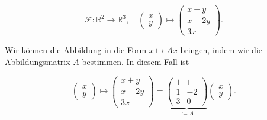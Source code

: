 \begin{equation*}
    \mathcal{F}: \mathbb{R}^2 \rightarrow \mathbb{R}^3, \quad \begin{pmatrix} x \\ y \end{pmatrix} \mapsto \begin{pmatrix} x + y \\ x - 2y \\ 3x \end{pmatrix}.
\end{equation*}

\vspace{0.5\baselineskip}

Wir können die Abbildung in die Form \( x \mapsto Ax \) bringen, indem wir die Abbildungsmatrix \( A \) bestimmen. In diesem Fall ist

\begin{equation*}
    \begin{pmatrix} x \\ y \end{pmatrix} \mapsto \begin{pmatrix} x + y \\ x - 2y \\ 3x \end{pmatrix} = \underbrace{\begin{pmatrix} 1 & 1 \\ 1 & -2 \\ 3 & 0 \end{pmatrix}}_{:=A} \begin{pmatrix} x \\ y \end{pmatrix}.
\end{equation*}